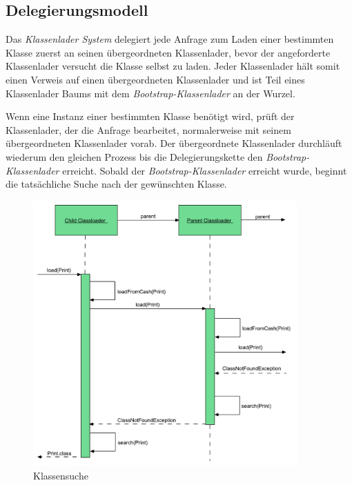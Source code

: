   \subsection{Delegierungsmodell} \label{sec:dm}
    
    Das \textit{Klassenlader System} delegiert jede Anfrage zum Laden einer bestimmten Klasse zuerst an seinen übergeordneten Klassenlader, bevor der angeforderte Klassenlader versucht die Klasse selbst zu laden. Jeder Klassenlader hält somit einen Verweis auf einen übergeordneten Klassenlader und ist Teil eines Klassenlader Baums mit dem \textit{Bootstrap-Klassenlader} an der Wurzel. 

    Wenn eine Instanz einer bestimmten Klasse benötigt wird, prüft der Klassenlader, der die Anfrage bearbeitet, normalerweise mit seinem übergeordneten Klassenlader vorab. Der übergeordnete Klassenlader durchläuft wiederum den gleichen Prozess bis die Delegierungskette den \textit{Bootstrap-Klassenlader} erreicht. Sobald der \textit{Bootstrap-Klassenlader} erreicht wurde, beginnt die tatsächliche Suche nach der gewünschten Klasse.

    \begin{figure}[h]
      \centering
      \includegraphics[width=0.9\textwidth]{material/images/flussCL.pdf}
      \caption{Klassensuche \cite{Forman04javareflection}}
      \label{fig:deligation}
    \end{figure}

